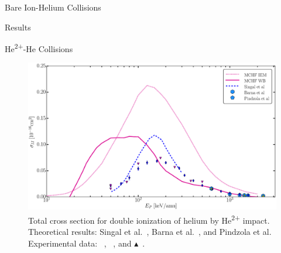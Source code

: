 \documentclass[a5paper, 9 pt]{extreport}
\begin{document}
\begin{chapter}{Bare Ion-Helium Collisions \label{chap:p-he2p-he}}
\begin{section}{Results \label{sec:phe2p-res}}
\begin{subsection}{\texorpdfstring{He\textsuperscript{2+}}{He2+}-He Collisions
                         \label{sec:he2phe-res}}
         \begin{figure}[t]
            \centering
            \includegraphics[width = 0.95 \linewidth]{./images/he2phe/he2phe-II.eps}
            \caption[Total cross section for double ionization of helium by He\textsuperscript{2+}
                     impact.]{Total cross section for double ionization of helium by
                     He\textsuperscript{2+} impact. Theoretical results: Singal
                     et al.~\cite{SL-91}, Barna
                     et al.~\cite{BTB-05}, and Pindzola et al.~\cite{PRC-07}
                     Experimental data: {\color{blue}{$\blacklozenge$}}~\cite{SG85},
                     {\color{RedViolet}{$\blacktriangledown$}}~\cite{Dubois87}, and
                     {\color{GreenYellow}$\blacktriangle$}~\cite{KAH84}. \label{fig:he2phe-ii}}
         \end{figure}


\end{subsection}
\end{section}
\end{chapter}
\end{document}
